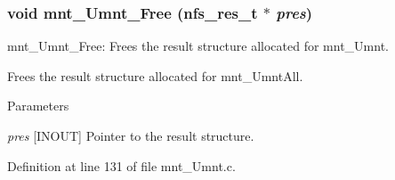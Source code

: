\subsubsection[{mnt\_\-Umnt\_\-Free}]{\setlength{\rightskip}{0pt plus 5cm}void mnt\_\-Umnt\_\-Free (nfs\_\-res\_\-t $\ast$ {\em pres})}\label{mnt__Umnt_8c_a0aed32a96096e0a88bccd4698f103a9f}
mnt\_\-Umnt\_\-Free: Frees the result structure allocated for mnt\_\-Umnt.

Frees the result structure allocated for mnt\_\-UmntAll.


\begin{DoxyParams}{Parameters}
\item[{\em pres}][INOUT] Pointer to the result structure. \end{DoxyParams}


Definition at line 131 of file mnt\_\-Umnt.c.